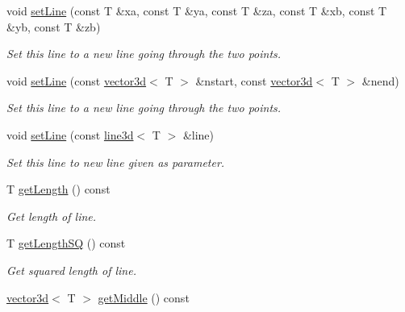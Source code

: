 \begin{DoxyCompactItemize}
\mbox{\label{classirr_1_1core_1_1line3d_aa691426799bff0ccf37bc09f56b8fa59}} 
void \hyperlink{classirr_1_1core_1_1line3d_aa691426799bff0ccf37bc09f56b8fa59}{set\+Line} (const T \&xa, const T \&ya, const T \&za, const T \&xb, const T \&yb, const T \&zb)
\begin{DoxyCompactList}\small\item\em Set this line to a new line going through the two points. \end{DoxyCompactList}\item 
\mbox{\label{classirr_1_1core_1_1line3d_af66862d06acc114567e1e0cfaa23f429}} 
void \hyperlink{classirr_1_1core_1_1line3d_af66862d06acc114567e1e0cfaa23f429}{set\+Line} (const \hyperlink{classirr_1_1core_1_1vector3d}{vector3d}$<$ T $>$ \&nstart, const \hyperlink{classirr_1_1core_1_1vector3d}{vector3d}$<$ T $>$ \&nend)
\begin{DoxyCompactList}\small\item\em Set this line to a new line going through the two points. \end{DoxyCompactList}\item 
\mbox{\label{classirr_1_1core_1_1line3d_a75d2a9f34ca66c2a1399f8b9fe0fa760}} 
void \hyperlink{classirr_1_1core_1_1line3d_a75d2a9f34ca66c2a1399f8b9fe0fa760}{set\+Line} (const \hyperlink{classirr_1_1core_1_1line3d}{line3d}$<$ T $>$ \&line)
\begin{DoxyCompactList}\small\item\em Set this line to new line given as parameter. \end{DoxyCompactList}\item 
T \hyperlink{classirr_1_1core_1_1line3d_aa6bf257a8b227c4f5d974ee76607a700}{get\+Length} () const
\begin{DoxyCompactList}\small\item\em Get length of line. \end{DoxyCompactList}\item 
T \hyperlink{classirr_1_1core_1_1line3d_a4754398992c5922efe33cad0bf773ddc}{get\+Length\+SQ} () const
\begin{DoxyCompactList}\small\item\em Get squared length of line. \end{DoxyCompactList}\item 
\hyperlink{classirr_1_1core_1_1vector3d}{vector3d}$<$ T $>$ \hyperlink{classirr_1_1core_1_1line3d_a14d8d80862836da4ecf51db9dcab95ee}{get\+Middle} () const

\end{DoxyCompactItemize}
